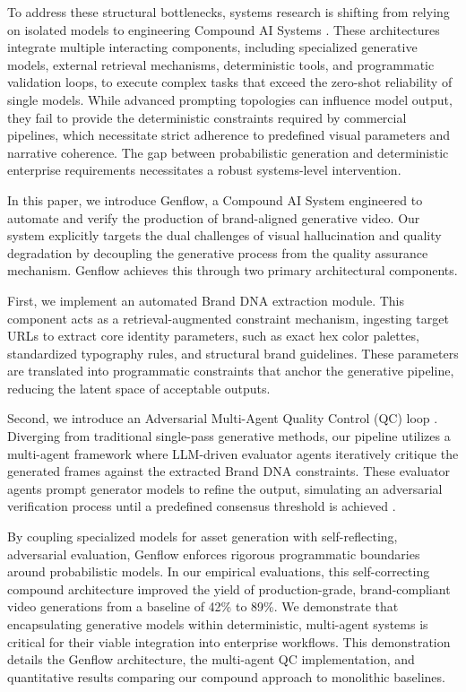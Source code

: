 \documentclass[sigconf,authordraft]{acmart}
\begin{document}
To address these structural bottlenecks, systems research is shifting from relying on isolated models to engineering Compound AI Systems \cite{zaharia2024shift}. These architectures integrate multiple interacting components, including specialized generative models, external retrieval mechanisms, deterministic tools, and programmatic validation loops, to execute complex tasks that exceed the zero-shot reliability of single models. While advanced prompting topologies can influence model output, they fail to provide the deterministic constraints required by commercial pipelines, which necessitate strict adherence to predefined visual parameters and narrative coherence. The gap between probabilistic generation and deterministic enterprise requirements necessitates a robust systems-level intervention.

In this paper, we introduce Genflow, a Compound AI System engineered to automate and verify the production of brand-aligned generative video. Our system explicitly targets the dual challenges of visual hallucination and quality degradation by decoupling the generative process from the quality assurance mechanism. Genflow achieves this through two primary architectural components.

First, we implement an automated Brand DNA extraction module. This component acts as a retrieval-augmented constraint mechanism, ingesting target URLs to extract core identity parameters, such as exact hex color palettes, standardized typography rules, and structural brand guidelines. These parameters are translated into programmatic constraints that anchor the generative pipeline, reducing the latent space of acceptable outputs.

Second, we introduce an Adversarial Multi-Agent Quality Control (QC) loop \cite{du2024improving, liang2024encouraging}. Diverging from traditional single-pass generative methods, our pipeline utilizes a multi-agent framework where LLM-driven evaluator agents iteratively critique the generated frames against the extracted Brand DNA constraints. These evaluator agents prompt generator models to refine the output, simulating an adversarial verification process until a predefined consensus threshold is achieved \cite{shinn2023reflexion}.

By coupling specialized models for asset generation with self-reflecting, adversarial evaluation, Genflow enforces rigorous programmatic boundaries around probabilistic models. In our empirical evaluations, this self-correcting compound architecture improved the yield of production-grade, brand-compliant video generations from a baseline of 42\% to 89\%. We demonstrate that encapsulating generative models within deterministic, multi-agent systems is critical for their viable integration into enterprise workflows. This demonstration details the Genflow architecture, the multi-agent QC implementation, and quantitative results comparing our compound approach to monolithic baselines.
\end{document}
